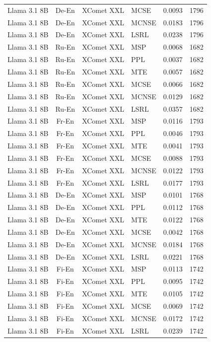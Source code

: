 \begin{table}
\begin{tabular}{lc}
Llama 3.1 8B & De-En & XComet XXL & MCSE & 0.0093 & 1796 \\
Llama 3.1 8B & De-En & XComet XXL & MCNSE & 0.0183 & 1796 \\
Llama 3.1 8B & De-En & XComet XXL & LSRL & 0.0238 & 1796 \\
Llama 3.1 8B & Ru-En & XComet XXL & MSP & 0.0068 & 1682 \\
Llama 3.1 8B & Ru-En & XComet XXL & PPL & 0.0037 & 1682 \\
Llama 3.1 8B & Ru-En & XComet XXL & MTE & 0.0057 & 1682 \\
Llama 3.1 8B & Ru-En & XComet XXL & MCSE & 0.0066 & 1682 \\
Llama 3.1 8B & Ru-En & XComet XXL & MCNSE & 0.0129 & 1682 \\
Llama 3.1 8B & Ru-En & XComet XXL & LSRL & 0.0357 & 1682 \\
Llama 3.1 8B & Fr-En & XComet XXL & MSP & 0.0116 & 1793 \\
Llama 3.1 8B & Fr-En & XComet XXL & PPL & 0.0046 & 1793 \\
Llama 3.1 8B & Fr-En & XComet XXL & MTE & 0.0041 & 1793 \\
Llama 3.1 8B & Fr-En & XComet XXL & MCSE & 0.0088 & 1793 \\
Llama 3.1 8B & Fr-En & XComet XXL & MCNSE & 0.0122 & 1793 \\
Llama 3.1 8B & Fr-En & XComet XXL & LSRL & 0.0177 & 1793 \\
Llama 3.1 8B & De-En & XComet XXL & MSP & 0.0101 & 1768 \\
Llama 3.1 8B & De-En & XComet XXL & PPL & 0.0112 & 1768 \\
Llama 3.1 8B & De-En & XComet XXL & MTE & 0.0122 & 1768 \\
Llama 3.1 8B & De-En & XComet XXL & MCSE & 0.0042 & 1768 \\
Llama 3.1 8B & De-En & XComet XXL & MCNSE & 0.0184 & 1768 \\
Llama 3.1 8B & De-En & XComet XXL & LSRL & 0.0221 & 1768 \\
Llama 3.1 8B & Fi-En & XComet XXL & MSP & 0.0113 & 1742 \\
Llama 3.1 8B & Fi-En & XComet XXL & PPL & 0.0095 & 1742 \\
Llama 3.1 8B & Fi-En & XComet XXL & MTE & 0.0105 & 1742 \\
Llama 3.1 8B & Fi-En & XComet XXL & MCSE & 0.0069 & 1742 \\
Llama 3.1 8B & Fi-En & XComet XXL & MCNSE & 0.0172 & 1742 \\
Llama 3.1 8B & Fi-En & XComet XXL & LSRL & 0.0239 & 1742 \\

\end{tabular}
\end{table}
